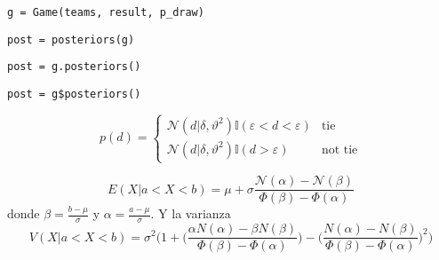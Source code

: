 \documentclass[article]{jss}
\newif\ifen
\newcommand{\en}[1]{\ifen#1\fi}
\newcommand{\N}{\mathcal{N}}
\begin{document}

\en{Los métodos para aproximar una distribución intratable mediante una una distribución perteneciente a una familia conocida se conocen en inferencia bayesiana como ``variacionales''.}
%
\en{En esta sección vamos a mostrar cómo encontrar la distribución Gaussiana que mejor aproxima al posterior exacto, considerando además la posibilidad de empate.}
%
\begin{lstlisting}[backgroundcolor=\color{all},belowskip=-0.77 \baselineskip]
g = Game(teams, result, p_draw)
\end{lstlisting}  
\begin{paracol}{3}
\begin{lstlisting}[backgroundcolor=\color{julia}]
post = posteriors(g)
\end{lstlisting}
\switchcolumn
\begin{lstlisting}[backgroundcolor=\color{python}]
post = g.posteriors()
\end{lstlisting}
\switchcolumn
\begin{lstlisting}[backgroundcolor=\color{r}]
post = g$posteriors()
\end{lstlisting}
\end{paracol}
%
\en{La necesidad de aproximar el posterior ocurre debido a que la probabilidad de la diferencia de rendimientos de los equipos es una Gasussian truncada (Eq.~\ref{eq:p_d}).}
%
\begin{equation}\label{eq:p_d}
p(d) =
\begin{cases}
\N(d|\delta,\vartheta^2) \mathbb{I}(\varepsilon < d < \varepsilon) & \text{tie} \\
\N(d|\delta,\vartheta^2) \mathbb{I}(d > \varepsilon) & \text{not tie}
\end{cases}
\end{equation}
%
\en{Siguiendo la familia de métodos variacionales conocidos como \emph{expectation propagation}~\ref{minka}, primero buscamos la Gaussiana que mejor aproxima a la Gaussiana truncada, y luego propogamos los mensajes.}
%
\en{Se sabe~\cite{} que la Gaussiana que mejor aproxima a una Gaussiana truncada $\N(x|\mu,\sigma^2)$ en el intervalo $[a,b]$ tiene como esperanza.}
%
\begin{equation}\label{eq:mean_aprox_double}
 E(X| a < X < b) = \mu + \sigma \frac{\N(\alpha) - \N(\beta) }{\Phi(\beta) - \Phi(\alpha) }
\end{equation}
%
donde $\beta = \frac{b-\mu}{\sigma}$ y $\alpha = \frac{a-\mu}{\sigma}$.
%
Y la varianza
%
\begin{equation}\label{eq:variance_aprox_double}
 V(X| a < X < b) = \sigma^2 \Bigg( 1 + \bigg(\frac{\alpha N(\alpha) - \beta N(\beta) }{\Phi(\beta) - \Phi(\alpha) }\bigg) - \bigg(\frac{N(\alpha) - N(\beta) }{\Phi(\beta) - \Phi(\alpha) }\bigg)^2 \Bigg)
\end{equation}
\end{document}
